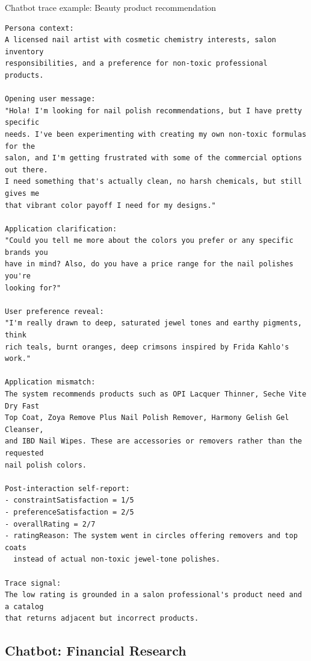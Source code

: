 \begin{promptbox}[label={box:trace-beauty}]{Chatbot trace example: Beauty product recommendation}
\begin{lstlisting}
Persona context:
A licensed nail artist with cosmetic chemistry interests, salon inventory
responsibilities, and a preference for non-toxic professional products.

Opening user message:
"Hola! I'm looking for nail polish recommendations, but I have pretty specific
needs. I've been experimenting with creating my own non-toxic formulas for the
salon, and I'm getting frustrated with some of the commercial options out there.
I need something that's actually clean, no harsh chemicals, but still gives me
that vibrant color payoff I need for my designs."

Application clarification:
"Could you tell me more about the colors you prefer or any specific brands you
have in mind? Also, do you have a price range for the nail polishes you're
looking for?"

User preference reveal:
"I'm really drawn to deep, saturated jewel tones and earthy pigments, think
rich teals, burnt oranges, deep crimsons inspired by Frida Kahlo's work."

Application mismatch:
The system recommends products such as OPI Lacquer Thinner, Seche Vite Dry Fast
Top Coat, Zoya Remove Plus Nail Polish Remover, Harmony Gelish Gel Cleanser,
and IBD Nail Wipes. These are accessories or removers rather than the requested
nail polish colors.

Post-interaction self-report:
- constraintSatisfaction = 1/5
- preferenceSatisfaction = 2/5
- overallRating = 2/7
- ratingReason: The system went in circles offering removers and top coats
  instead of actual non-toxic jewel-tone polishes.

Trace signal:
The low rating is grounded in a salon professional's product need and a catalog
that returns adjacent but incorrect products.
\end{lstlisting}
\end{promptbox}

\subsection{Chatbot: Financial Research}
\label{app:finance-results}

